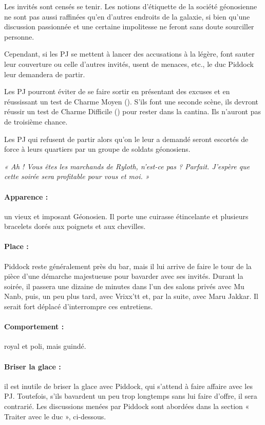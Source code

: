 \documentclass[a4paper,10pt,twoside,twocolumn,openany]{book}
\begin{document}
Les invités sont censés se tenir. Les notions d’étiquette
de la société géonosienne ne sont pas aussi raffinées
qu’en d’autres endroits de la galaxie, si bien qu’une discussion passionnée et une certaine impolitesse ne feront
sans doute sourciller personne.

Cependant, si les PJ se mettent à lancer des accusations à la légère, font sauter leur couverture ou celle
d’autres invités, usent de menaces, etc., le duc Piddock
leur demandera de partir.

Les PJ pourront éviter de se faire sortir en présentant des excuses et en réussissant un test de Charme
Moyen (\difficulty \difficulty). S’ils font une seconde scène, ils devront réussir un test de Charme Difficile (\difficulty \difficulty \difficulty) pour
rester dans la cantina. Ils n’auront pas de troisième
chance.

Les PJ qui refusent de partir alors qu’on le leur a demandé seront escortés de force à leurs quartiers par un
groupe de soldats géonosiens.

\subtitle{LE DUC PIDDOCK}
\emph{« Ah ! Vous êtes les marchands de Ryloth, n’est-ce
pas ? Parfait. J’espère que cette soirée sera profitable
pour vous et moi. »}

\paragraph{Apparence :} un vieux et imposant Géonosien. Il porte
une cuirasse étincelante et plusieurs bracelets dorés aux
poignets et aux chevilles.

\paragraph{Place :} Piddock reste généralement près du bar, mais
il lui arrive de faire le tour de la pièce d’une démarche
majestueuse pour bavarder avec ses invités. Durant la
soirée, il passera une dizaine de minutes dans l’un des
salons privés avec Mu Nanb, puis, un peu plus tard, avec
Vrixx’tt et, par la suite, avec Maru Jakkar. Il serait fort
déplacé d’interrompre ces entretiens.

\paragraph{Comportement :} royal et poli, mais guindé.

\paragraph{Briser la glace :} il est inutile de briser la glace avec
Piddock, qui s’attend à faire affaire avec les PJ. Toutefois, s’ils bavardent un peu trop longtemps sans lui faire
d’offre, il sera contrarié. Les discussions menées par
Piddock sont abordées dans la section « Traiter avec le
duc », ci-dessous.
\end{document}
